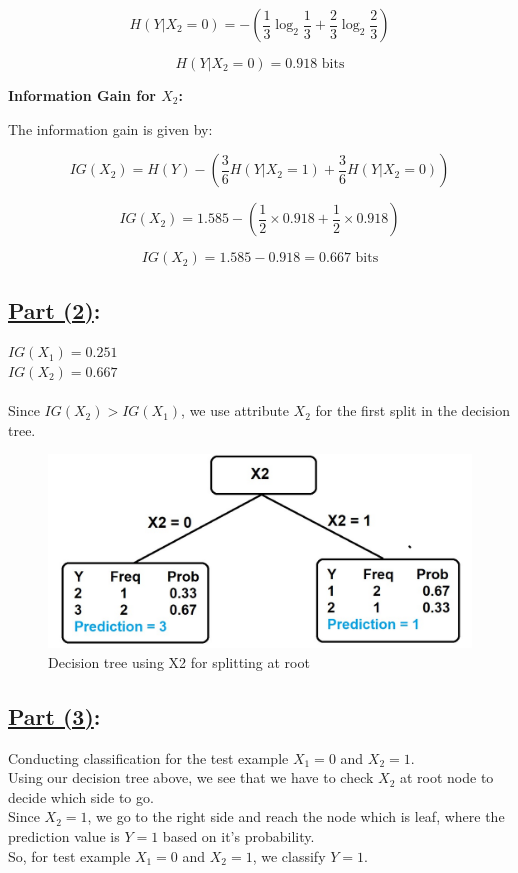 \documentclass[12pt]{article}
\begin{document}
\[
  H(Y|X_2 = 0) = -\left( \frac{1}{3} \log_2 \frac{1}{3} + \frac{2}{3} \log_2 \frac{2}{3} \right)
\]

\[
  H(Y|X_2 = 0) = 0.918 \text{ bits}
\]

\textbf{Information Gain for $X_2$:}

The information gain is given by:

\[
  IG(X_2) = H(Y) - \left( \frac{3}{6} H(Y|X_2 = 1) + \frac{3}{6} H(Y|X_2 = 0) \right)
\]

\[
  IG(X_2) = 1.585 - \left( \frac{1}{2} \times 0.918 + \frac{1}{2} \times 0.918 \right)
\]

\[
  IG(X_2) = 1.585 - 0.918 = 0.667 \text{ bits}
\]

\subsection*{\underline{Part (2)}:}
$IG(X_1) = 0.251$\\
$IG(X_2) = 0.667$\\\\
Since $IG(X_2) > IG(X_1)$, we use attribute $X_2$ for the first split in the decision tree.

\begin{figure}[h!] %
  \centering %
  \includegraphics[width=\textwidth]{tree_image.jpeg} %
  \caption{Decision tree using X2 for splitting at root} %
  \label{fig:your_label} %
\end{figure}


\subsection*{\underline{Part (3)}:}
Conducting classification for the test example $X_1 = 0$ and $X_2 = 1$.\\
Using our decision tree above, we see that we have to check $X_2$ at root node to decide which side to go.\\
Since $X_2 = 1$, we go to the right side and reach the node which is leaf, where the prediction value is $Y = 1$ based on it's probability.\\
So, for test example $X_1 = 0$ and $X_2 = 1$, we classify $Y = 1$.
\end{document}
